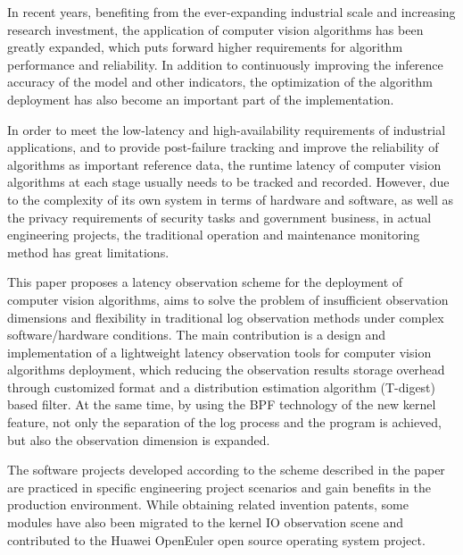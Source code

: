 \documentclass[master,anonymous]{shtthesis}
\begin{document}
\begin{abstract*}[flattitle]
In recent years, benefiting from the ever-expanding industrial scale and increasing research investment, the application of computer vision algorithms has been greatly expanded, which puts forward higher requirements for algorithm performance and reliability. In addition to continuously improving the  inference accuracy of the model and other indicators, the optimization of the algorithm deployment has also become an important part of the implementation.

In order to meet the low-latency and high-availability requirements of industrial applications, and to provide post-failure tracking and improve the reliability of algorithms as important reference data, the runtime latency of computer vision algorithms at each stage usually needs to be tracked and recorded. However, due to the complexity of its own system in terms of hardware and software, as well as the privacy requirements of security tasks and government business, in actual engineering projects, the traditional operation and maintenance monitoring method has great limitations.

This paper proposes a latency observation scheme for the deployment of computer vision algorithms, aims to solve the problem of insufficient observation dimensions and flexibility in traditional log observation methods under complex software/hardware conditions. The main contribution is a design and implementation of a lightweight latency observation tools for computer vision algorithms deployment, which reducing the observation results storage overhead through customized format and a distribution estimation algorithm (T-digest) based filter. At the same time, by using the BPF technology of the new kernel feature, not only the separation of the log process and the program is achieved, but also the observation dimension is expanded.

The software projects developed according to the scheme described in the paper are practiced in specific engineering project scenarios and gain benefits in the production environment. While obtaining related invention patents, some modules have also been migrated to the kernel IO observation scene and contributed to the Huawei OpenEuler open source operating system project.

\end{abstract*}

\makeindices
\end{document}

